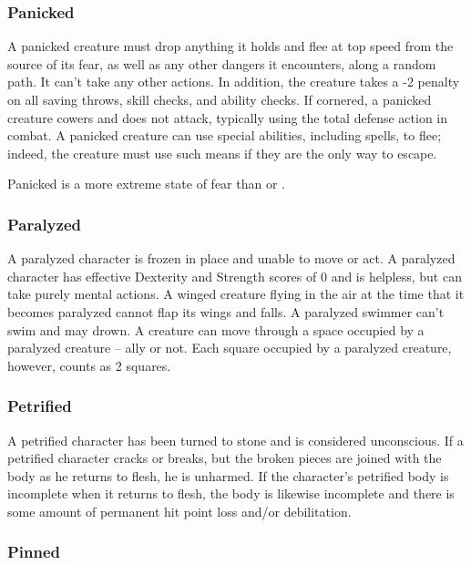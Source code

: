 \subsubsection{Panicked}

A panicked creature must drop anything it holds and flee at 
top speed from the source of its fear, as well as any other dangers it encounters, 
along a random path. It can't take any other actions. In addition, the creature 
takes a -2 penalty on all saving throws, skill checks, and ability checks. If cornered, 
a panicked creature cowers and does not attack, typically using the total defense 
action in combat. A panicked creature can use special abilities, including spells, 
to flee; indeed, the creature must use such means if they are the only way to escape.

Panicked is a more extreme state of fear than  or .

\subsubsection{Paralyzed}

A paralyzed character is frozen in place and unable to move 
or act. A paralyzed character has effective Dexterity and Strength scores of 0 
and is helpless, but can take purely mental actions. A winged creature flying in 
the air at the time that it becomes paralyzed cannot flap its wings and falls. 
A paralyzed swimmer can't swim and may drown. A creature can move through a space 
occupied by a paralyzed creature -- ally or not. Each square occupied by a paralyzed 
creature, however, counts as 2 squares.

\subsubsection{Petrified}

A petrified character has been turned to stone and is considered 
unconscious. If a petrified character cracks or breaks, but the broken pieces are 
joined with the body as he returns to flesh, he is unharmed. If the character's 
petrified body is incomplete when it returns to flesh, the body is likewise incomplete 
and there is some amount of permanent hit point loss and/or debilitation.

\subsubsection{Pinned}

